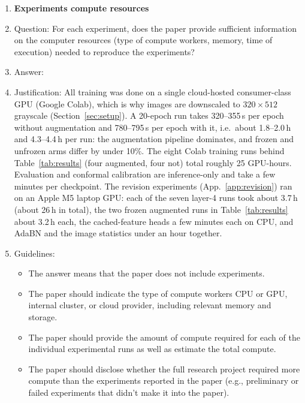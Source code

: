 \begin{enumerate}
\begin{itemize}
        \item For asymmetric distributions, the authors should be careful not to show in tables or figures symmetric error bars that would yield results that are out of range (e.g., negative error rates).
        \item If error bars are reported in tables or plots, the authors should explain in the text how they were calculated and reference the corresponding figures or tables in the text.
    \end{itemize}

\item {\bf Experiments compute resources}
    \item[] Question: For each experiment, does the paper provide sufficient information on the computer resources (type of compute workers, memory, time of execution) needed to reproduce the experiments?
    \item[] Answer: \answerYes{}
    \item[] Justification: All training was done on a single cloud-hosted consumer-class GPU (Google Colab), which is
    why images are downscaled to $320{\times}512$ grayscale (Section~\ref{sec:setup}). A
    20-epoch run takes 320--355\,s per epoch without augmentation and 780--795\,s per
    epoch with it, i.e.\ about 1.8--2.0\,h and 4.3--4.4\,h per run: the augmentation
    pipeline dominates, and frozen and unfrozen arms differ by under 10\%. The eight
    Colab training runs behind Table~\ref{tab:results} (four augmented, four not) total
    roughly 25 GPU-hours. Evaluation
    and conformal calibration are inference-only and take a few minutes per checkpoint.
    The revision experiments (App.~\ref{app:revision}) ran on an Apple M5 laptop GPU:
    each of the seven layer-4 runs took about 3.7\,h (about 26\,h in total), the two
    frozen augmented runs in Table~\ref{tab:results} about 3.2\,h each, the
    cached-feature heads a few minutes each on CPU, and AdaBN and the image statistics
    under an hour together.
    \item[] Guidelines:
    \begin{itemize}
        \item The answer \answerNA{} means that the paper does not include experiments.
        \item The paper should indicate the type of compute workers CPU or GPU, internal cluster, or cloud provider, including relevant memory and storage.
        \item The paper should provide the amount of compute required for each of the individual experimental runs as well as estimate the total compute. 
        \item The paper should disclose whether the full research project required more compute than the experiments reported in the paper (e.g., preliminary or failed experiments that didn't make it into the paper). 
    \end{itemize}
    

\end{enumerate}

